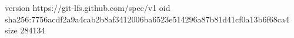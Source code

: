 version https://git-lfs.github.com/spec/v1
oid sha256:7756acdf2a9a4cab2b8af3412006ba6523e514296a87b81d41cf0a13b6f68ca4
size 284134
